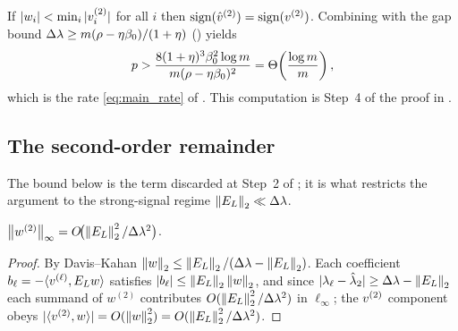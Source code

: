\begin{corollary}\label{cor:C-cond}
If $|w_i|<\min_i|v^{(2)}_i|$ for all $i$ then
$\operatorname{sign}(\hat v^{(2)})=\operatorname{sign}(v^{(2)})$. Combining
 with the gap bound
$\Delta\lambda\ge m(\rho-\eta\beta_0)/(1+\eta)$ () yields
\begin{equation}\label{eq:per-node-p}
   p>\frac{8(1+\eta)^3\beta_0^2\log m}{m(\rho-\eta\beta_0)^2}
    =\Theta\!\left(\frac{\log m}{m}\right),
\end{equation}
which is the rate \eqref{eq:main_rate} of . This computation is
Step~4 of the proof in .
\end{corollary}

\subsection{The second-order remainder}\label{app:comp3c}

The bound below is the term discarded at Step~2 of ; it is
what restricts the argument to the strong-signal regime $\left\lVert E_{L} \right\rVert_{2}\ll\Delta\lambda$.

\begin{lemma}\label{lem:C-remainder}
$\left\lVert w^{(2)} \right\rVert_\infty=O\!\bigl(\left\lVert E_{L} \right\rVert_{2}^2/\Delta\lambda^2\bigr)$.
\end{lemma}
\begin{proof}
By Davis--Kahan $\left\lVert w \right\rVert_2\le\left\lVert E_{L} \right\rVert_{2}/(\Delta\lambda-\left\lVert E_{L} \right\rVert_{2})$. Each coefficient
$b_\ell=-\langle v^{(\ell)},E_{L} w\rangle$ satisfies $|b_\ell|\le\left\lVert E_{L} \right\rVert_{2}\left\lVert w \right\rVert_2$,
and since $|\lambda_\ell-\hat\lambda_2|\ge\Delta\lambda-\left\lVert E_{L} \right\rVert_{2}$ each summand of
$w^{(2)}$ contributes $O(\left\lVert E_{L} \right\rVert_{2}^2/\Delta\lambda^2)$ in $\ell_\infty$; the $v^{(2)}$
component obeys $|\langle v^{(2)},w\rangle|=O(\left\lVert w \right\rVert_2^2)=O(\left\lVert E_{L} \right\rVert_{2}^2/\Delta\lambda^2)$.
\end{proof}
